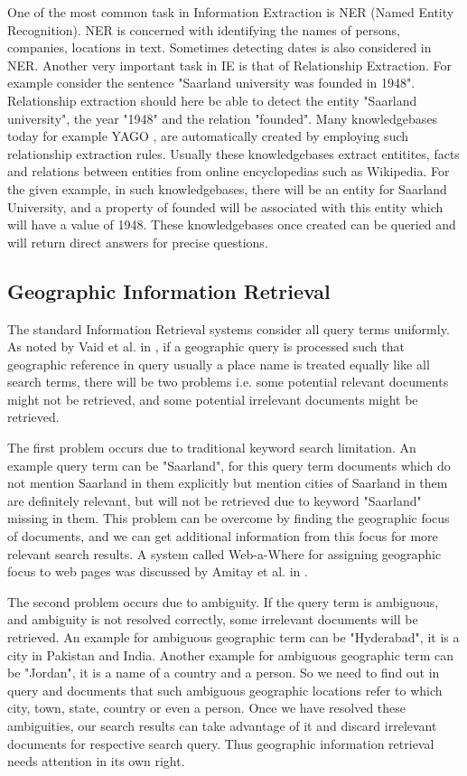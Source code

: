 \documentclass[
     11pt,         %
     a4paper,      %
     oneside,
     ]{article}
\begin{document}
One of the most common task in Information Extraction is NER (Named Entity Recognition). NER is concerned with identifying the names of persons, companies, locations in text. Sometimes detecting dates is also considered in NER. Another very important task in IE is that of Relationship Extraction. For example consider the sentence "Saarland university was founded in 1948". Relationship extraction should here be able to detect the entity "Saarland university", the year "1948" and the relation "founded". Many knowledgebases today for example YAGO \cite{yago-website}, are automatically created by employing such relationship extraction rules. Usually these knowledgebases extract entitites, facts and relations between entities from online encyclopedias such as Wikipedia. For the given example, in such knowledgebases, there will be an entity for Saarland University, and a property of founded will be associated with this entity which will have a value of 1948. These knowledgebases once created can be queried and will return direct answers for precise questions.
\subsection{Geographic Information Retrieval}
The standard Information Retrieval systems consider all query terms uniformly. As noted by Vaid et al. in \cite{Vaid:2005:SIG:2156226.2156244}, if a geographic query is processed such that geographic reference in query usually a place name is treated equally like all search terms, there will be two problems i.e. some potential relevant documents might not be retrieved, and some potential irrelevant documents might be retrieved. 

The first problem occurs due to traditional keyword search limitation. An example query term can be "Saarland", for this query term  documents which do not mention Saarland in them explicitly but mention cities of Saarland in them are definitely relevant, but will not be retrieved due to keyword "Saarland" missing in them. This problem can be overcome by finding the geographic focus of documents, and we can get additional information from this focus for more relevant search results. A system called Web-a-Where for assigning geographic focus to web pages was discussed by Amitay et al. in \cite{Amitay:2004:WGW:1008992.1009040}. 

The second problem occurs due to ambiguity. If the query term is ambiguous, and ambiguity is not resolved correctly, some irrelevant documents will be retrieved. An example for ambiguous geographic term can be "Hyderabad", it is a city in Pakistan and India. Another example for ambiguous geographic term can be "Jordan", it is a name of a country and a person. So we need to find out in query and documents that such ambiguous geographic locations refer to which city, town, state, country or even a person. Once we have resolved these ambiguities, our search results can take advantage of it and discard irrelevant documents for respective search query. Thus geographic information retrieval needs attention in its own right.  
\end{document}
